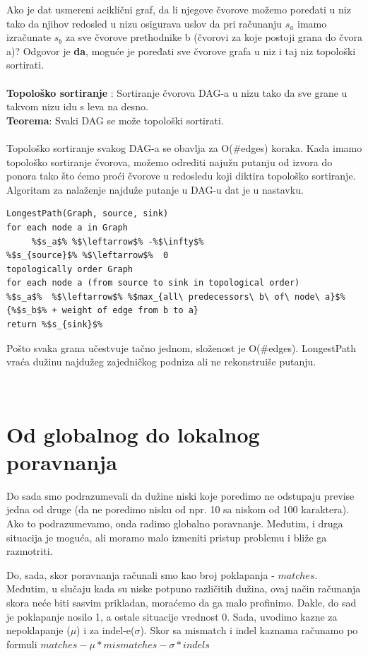 Ako je dat usmereni aciklični graf, da li njegove čvorove možemo poređati u niz tako da njihov redosled u nizu osigurava uslov da pri računanju $s_a$ imamo izračunate $s_b$ za sve čvorove prethodnike b (čvorovi za koje postoji grana do čvora a)? Odgovor je \textbf{da}, moguće je poređati sve čvorove grafa u niz i taj niz topološki sortirati.
\\
\\
\noindent\textbf{Topološko sortiranje} : Sortiranje čvorova DAG-a u nizu tako da sve grane u takvom nizu idu s leva na desno. \\
\textbf{ Teorema}: Svaki DAG se može topološki sortirati.
\\\\
Topološko sortiranje svakog DAG-a se obavlja za O(\#edges) koraka. Kada imamo topološko sortiranje čvorova, možemo odrediti najužu putanju od izvora do ponora tako što ćemo proći čvorove u redosledu koji diktira topološko sortiranje.  Algoritam za nalaženje najduže putanje u DAG-u dat je u nastavku.

\begin{lstlisting}
LongestPath(Graph, source, sink)
for each node a in Graph
     %$s_a$% %$\leftarrow$% -%$\infty$%
%$s_{source}$% %$\leftarrow$%  0
topologically order Graph
for each node a (from source to sink in topological order)
%$s_a$%  %$\leftarrow$% %$max_{all\ predecessors\ b\ of\ node\ a}$% {%$s_b$% + weight of edge from b to a}
return %$s_{sink}$%
\end{lstlisting}

Pošto svaka grana učestvuje tačno jednom, složenost je O(\#edges). LongestPath vraća dužinu najdužeg zajedničkog podniza ali ne rekonstruiše putanju.

~
\section{Od globalnog do lokalnog poravnanja}

Do sada smo podrazumevali da dužine niski koje poredimo ne odstupaju previse jedna od druge (da ne poredimo nisku od npr. 10 sa niskom od 100 karaktera). Ako to podrazumevamo, onda radimo globalno poravnanje. Međutim, i druga situacija je moguća, ali moramo malo izmeniti pristup problemu i bliže ga razmotriti.

Do, sada, skor poravnanja računali smo kao broj poklapanja - $matches$. Međutim, u slučaju kada su niske potpuno različitih dužina, ovaj način računanja skora neće biti sasvim prikladan, moraćemo da ga malo profinimo. Dakle, do sad je poklapanje nosilo 1, a ostale situacije vrednost 0. Sada, uvodimo kazne za nepoklapanje ($\mu$) i za indel-e($\sigma$). Skor sa mismatch i indel kaznama računamo po formuli $matches - \mu * mismatches - \sigma * indels$ 



